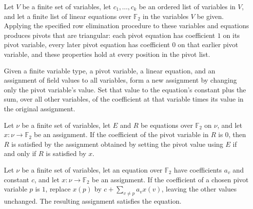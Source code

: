 \begin{theorem}
\leanok
{}
Let $V$ be a finite set of variables, let $c_1,\ldots,c_k$ be an ordered list of
variables in $V$, and let a finite list of linear equations over $\mathbb F_2$ in the
variables $V$ be given. Applying the specified row elimination procedure to these
variables and equations produces pivots that are triangular: each pivot equation has
coefficient $1$ on its pivot variable, every later pivot equation has coefficient $0$ on
that earlier pivot variable, and these properties hold at every position in the pivot
list.
\end{theorem}

\begin{definition}
\leanok
{}
Given a finite variable type, a pivot variable, a linear equation, and an assignment of
field values to all variables, form a new assignment by changing only the pivot
variable's value. Set that value to the equation's constant plus the sum, over all other
variables, of the coefficient at that variable times its value in the original
assignment.
\end{definition}

\begin{theorem}
\leanok
{}
Let $\nu$ be a finite set of variables, let $E$ and $R$ be equations over $\mathbb
F_2$ on $\nu$, and let $x:\nu\to\mathbb F_2$ be an assignment. If the coefficient of
the pivot variable in $R$ is $0$, then $R$ is satisfied by the assignment obtained by
setting the pivot value using $E$ if and only if $R$ is satisfied by $x$.
\end{theorem}

\begin{theorem}
\leanok
{}
Let $\nu$ be a finite set of variables, let an equation over $\mathbb F_2$ have
coefficients $a_v$ and constant $c$, and let $x:\nu\to\mathbb F_2$ be an assignment.
If the coefficient of a chosen pivot variable $p$ is $1$, replace $x(p)$ by
$c+\sum_{v\ne p}a_vx(v)$, leaving the other values unchanged. The resulting assignment
satisfies the equation.
\end{theorem}

